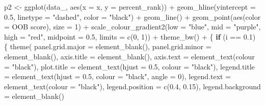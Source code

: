 \documentclass[
  11pt,
  oneside]{book}
\newenvironment{Shaded}{\begin{snugshade}}{\end{snugshade}}
\newcommand{\AttributeTok}[1]{\textcolor[rgb]{0.77,0.63,0.00}{#1}}
\newcommand{\ControlFlowTok}[1]{\textcolor[rgb]{0.13,0.29,0.53}{\textbf{#1}}}
\newcommand{\DecValTok}[1]{\textcolor[rgb]{0.00,0.00,0.81}{#1}}
\newcommand{\FloatTok}[1]{\textcolor[rgb]{0.00,0.00,0.81}{#1}}
\newcommand{\FunctionTok}[1]{\textcolor[rgb]{0.00,0.00,0.00}{#1}}
\newcommand{\NormalTok}[1]{#1}
\newcommand{\OtherTok}[1]{\textcolor[rgb]{0.56,0.35,0.01}{#1}}
\newcommand{\SpecialCharTok}[1]{\textcolor[rgb]{0.00,0.00,0.00}{#1}}
\newcommand{\StringTok}[1]{\textcolor[rgb]{0.31,0.60,0.02}{#1}}
\begin{document}
\begin{Shaded}
\begin{Highlighting}[]
\NormalTok{  p2 }\OtherTok{\textless{}{-}} \FunctionTok{ggplot}\NormalTok{(data\_, }\FunctionTok{aes}\NormalTok{(}\AttributeTok{x =}\NormalTok{ x, }\AttributeTok{y =} \StringTok{\textasciigrave{}}\AttributeTok{percent\_rank}\StringTok{\textasciigrave{}}\NormalTok{)) }\SpecialCharTok{+}
    \FunctionTok{geom\_hline}\NormalTok{(}\AttributeTok{yintercept =} \FloatTok{0.5}\NormalTok{, }\AttributeTok{linetype =} \StringTok{"dashed"}\NormalTok{, }\AttributeTok{color =} \StringTok{"black"}\NormalTok{) }\SpecialCharTok{+}
    \FunctionTok{geom\_line}\NormalTok{() }\SpecialCharTok{+}
    \FunctionTok{geom\_point}\NormalTok{(}\FunctionTok{aes}\NormalTok{(}\AttributeTok{color =} \StringTok{\textasciigrave{}}\AttributeTok{OOB score}\StringTok{\textasciigrave{}}\NormalTok{), }\AttributeTok{size =} \DecValTok{1}\NormalTok{) }\SpecialCharTok{+}
    \FunctionTok{scale\_colour\_gradient2}\NormalTok{(}\AttributeTok{low =} \StringTok{"blue"}\NormalTok{, }\AttributeTok{mid =} \StringTok{"purple"}\NormalTok{, }\AttributeTok{high =} \StringTok{"red"}\NormalTok{, }\AttributeTok{midpoint =} \FloatTok{0.5}\NormalTok{, }\AttributeTok{limits =} \FunctionTok{c}\NormalTok{(}\DecValTok{0}\NormalTok{, }\DecValTok{1}\NormalTok{)) }\SpecialCharTok{+}
    \FunctionTok{theme\_bw}\NormalTok{() }\SpecialCharTok{+}
\NormalTok{    \{}
      \ControlFlowTok{if}\NormalTok{ (i }\SpecialCharTok{==} \FloatTok{0.1}\NormalTok{) \{}
        \FunctionTok{theme}\NormalTok{(}
          \AttributeTok{panel.grid.major =} \FunctionTok{element\_blank}\NormalTok{(),}
          \AttributeTok{panel.grid.minor =} \FunctionTok{element\_blank}\NormalTok{(),}
          \AttributeTok{axis.title =} \FunctionTok{element\_blank}\NormalTok{(),}
          \AttributeTok{axis.text =} \FunctionTok{element\_text}\NormalTok{(}\AttributeTok{colour =} \StringTok{"black"}\NormalTok{),}
          \AttributeTok{plot.title =} \FunctionTok{element\_text}\NormalTok{(}\AttributeTok{hjust =} \FloatTok{0.5}\NormalTok{, }\AttributeTok{colour =} \StringTok{"black"}\NormalTok{),}
          \AttributeTok{legend.title =} \FunctionTok{element\_text}\NormalTok{(}\AttributeTok{hjust =} \FloatTok{0.5}\NormalTok{, }\AttributeTok{colour =} \StringTok{"black"}\NormalTok{, }\AttributeTok{angle =} \DecValTok{0}\NormalTok{),}
          \AttributeTok{legend.text =} \FunctionTok{element\_text}\NormalTok{(}\AttributeTok{colour =} \StringTok{"black"}\NormalTok{),}
          \AttributeTok{legend.position =} \FunctionTok{c}\NormalTok{(}\FloatTok{0.4}\NormalTok{, }\FloatTok{0.15}\NormalTok{),}
          \AttributeTok{legend.background =} \FunctionTok{element\_blank}\NormalTok{()}

\end{Highlighting}
\end{Shaded}
\end{document}
